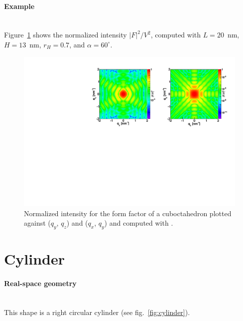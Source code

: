\paragraph{Example}\mbox{}\\
Figure~\ref{fig:FFcuboctahEx} shows the normalized intensity $|F|^2/V^2$, computed with $L=20$~nm, $H=13$~nm, $r_H=0.7$, and $\alpha=60^{\circ}$.
\begin{figure}[h]
\begin{center}
\includegraphics[width=\textwidth]{Figures/figffcuboctah}
\end{center}
\caption{Normalized intensity for the form factor of a cuboctahedron plotted against ($q_y$, $q_z$) and  ($q_x$, $q_y$) and computed with .}
\label{fig:FFcuboctahEx}
\end{figure}



\newpage%
\section{Cylinder} 
 
\paragraph{Real-space geometry}\mbox{}\\
This shape is a right circular cylinder (see fig.~\ref{fig:cylinder}).

